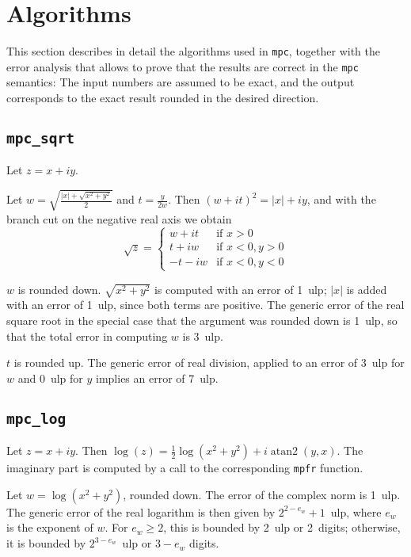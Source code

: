 \documentclass {article}
\newcommand {\mpc}{\texttt {mpc}}
\newcommand {\mpfr}{\texttt {mpfr}}
\newcommand {\ulp}[1]{#1~ulp}
\newcommand {\atantwo}{\operatorname {atan2}}
\begin{document}
\section {Algorithms}

This section describes in detail the algorithms used in \mpc, together with the error analysis that allows to prove that the results are correct in the {\mpc} semantics: The input numbers are assumed to be exact, and the output corresponds to the exact result rounded in the desired direction.


\subsection {\texttt {mpc\_sqrt}}

Let $z = x + i y$.

Let $w = \sqrt { \frac {|x| + \sqrt {x^2 + y^2}}{2}}$ and
$t = \frac {y}{2w}$. Then $(w + it)^2 = |x| + iy$, and with the branch cut on the negative real axis we obtain
\[
\sqrt z = \left\{
\begin {array}{cl}
w + i t & \text {if } x > 0 \\
t + i w & \text {if } x < 0, y > 0 \\
-t - i w & \text {if } x < 0, y < 0
\end {array}
\right.
\]

$w$ is rounded down. $\sqrt {x^2 + y^2}$ is computed with an error of \ulp{1}; $|x|$ is added with an error of \ulp{1}, since both terms are positive. The generic error of the real square root in the special case that the argument was rounded down is \ulp{1}, so that the total error in computing $w$ is \ulp{3}.

$t$ is rounded up. The generic error of real division, applied to an error of \ulp{3} for $w$ and \ulp{0} for $y$ implies an error of \ulp{7}.


\subsection {\texttt {mpc\_log}}

Let $z = x + i y$. Then $\log (z) = \frac {1}{2} \log (x^2 + y^2) + i \atantwo (y, x)$. The imaginary part is computed by a call to the corresponding {\mpfr} function.

Let $w = \log (x^2 + y^2)$, rounded down. The error of the complex norm is \ulp{1}. The generic error of the real logarithm is then given by \ulp{$2^{2 - e_w} + 1$}, where $e_w$ is the exponent of $w$. For $e_w \geq 2$, this is bounded by \ulp{2} or 2~digits; otherwise, it is bounded by \ulp{$2^{3 - e_w}$} or $3 - e_w$ digits.
\end{document}
